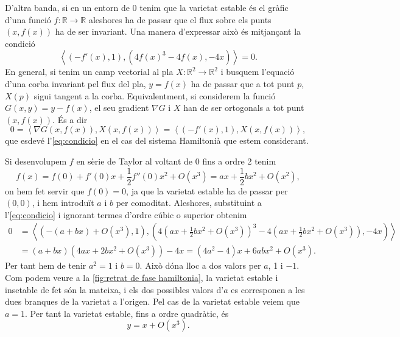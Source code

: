 \documentclass[12pt]{report}
\numberwithin{table}{section}
\numberwithin{equation}{section}
\numberwithin{figure}{section}
\newcommand{\R}{\mathbb{R}}
\newcommand{\inn}[2]{\left\langle #1 , #2 \right\rangle}
\begin{document}
\begin{enumerate}[label=(\roman*), font=\bfseries \sffamily, wide, labelwidth=!, labelindent=0pt]
		D'altra banda, si en un entorn de 0 tenim que la varietat estable és el gràfic d'una funció \( f \colon \R \to \R \) aleshores ha de passar que el flux sobre els punts \( (x, f(x)) \) ha de ser invariant. Una manera d'expressar això és mitjançant la condició
		\begin{equation} \label{eq:condicio}
			\inn{(-f'(x), 1)}{(4f(x)^3 - 4f(x), -4x)} = 0.
		\end{equation}
		En general, si tenim un camp vectorial al pla \( X \colon \R^2 \to \R^2 \) i busquem l'equació d'una corba invariant pel flux del pla, \( y = f(x) \) ha de passar que a tot punt \( p \), \( X(p) \) sigui tangent a la corba. Equivalentment, si considerem la funció \( G(x,y) = y - f(x) \), el seu gradient \( \nabla G \) i \( X \) han de ser ortogonals a tot punt \( (x, f(x)) \). És a dir
		\begin{equation*}
			0 = \inn{\nabla G(x, f(x))}{X(x, f(x))} = \inn{(-f'(x), 1)}{X(x, f(x))},
		\end{equation*}
		que esdevé l'\cref{eq:condicio} en el cas del sistema Hamiltonià que estem considerant.

		Si desenvolupem \( f \) en sèrie de Taylor al voltant de \( 0 \) fins a ordre 2 tenim
		\begin{equation*}
			f(x) = f(0) + f'(0)x + \frac{1}{2}f''(0)x^2 + O(x^3) = ax + \frac{1}{2}bx^2 + O(x^2),
		\end{equation*}
		on hem fet servir que \( f(0) = 0 \), ja que la varietat estable ha de passar per \( (0,0) \), i hem introduït \( a \) i \( b \) per comoditat. Aleshores, substituint a l'\cref{eq:condicio} i ignorant termes d'ordre cúbic o superior obtenim
		\begin{align*}
			0 & = \inn{(-(a + bx) + O(x^3), 1)}{\left(4\left(ax + \tfrac{1}{2}bx^2 + O(x^3)\right)^3 - 4\left(ax + \tfrac{1}{2}bx^2 + O(x^3)\right), -4x\right)} \\
				& = (a + bx)(4ax + 2bx^2 + O(x^3)) - 4x = (4a^2 - 4)x + 6abx^2 + O(x^3).
		\end{align*}
		Per tant hem de tenir \( a^2 = 1 \) i \( b = 0 \). Això dóna lloc a dos valors per \( a \), 1 i \( -1 \). Com podem veure a la \cref{fig:retrat de fase hamiltonia}, la varietat estable i insetable de fet són la mateixa, i els dos possibles valors d'\( a \) es corresponen a les dues branques de la varietat a l'origen. Pel cas de la varietat estable veiem que \( a  = 1 \). Per tant la varietat estable, fins a ordre quadràtic, és
		\begin{equation*}
			y = x + O(x^3). 
		\end{equation*}


\end{enumerate}
\end{document}
